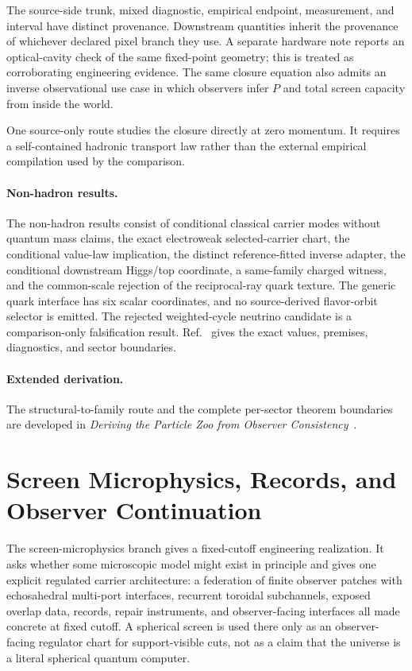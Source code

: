 The source-side trunk, mixed diagnostic, empirical endpoint, measurement, and
interval have distinct provenance. Downstream quantities inherit the provenance of whichever
declared pixel branch they use.
A separate hardware note reports an optical-cavity check of the same fixed-point geometry;
this is treated as corroborating engineering evidence.
The same closure equation also admits an inverse observational use case in which observers infer
\(P\) and total screen capacity from inside the world.

One source-only route studies the closure directly at zero momentum. It requires a self-contained
hadronic transport law rather than the external empirical compilation used by the comparison.

\paragraph{Non-hadron results.}
The non-hadron results consist of conditional classical carrier modes without
quantum mass claims, the exact electroweak selected-carrier chart, the
conditional value-law implication, the distinct reference-fitted inverse adapter, the conditional
downstream Higgs/top coordinate, a same-family charged witness, and the common-scale rejection of
the reciprocal-ray quark texture. The generic quark interface has six scalar coordinates, and no
source-derived flavor-orbit selector is emitted. The rejected weighted-cycle neutrino
candidate is a comparison-only falsification result. Ref.~\cite{ophparticles}
gives the exact values, premises, diagnostics, and sector boundaries.

\paragraph{Extended derivation.}
The structural-to-family route and the complete per-sector theorem boundaries
are developed in
\emph{Deriving the Particle Zoo from Observer Consistency}~\cite{ophparticles}.

\section{Screen Microphysics, Records, and Observer Continuation}

The screen-microphysics branch gives a fixed-cutoff engineering realization. It asks
whether some microscopic model might exist in principle and gives one explicit regulated
carrier architecture: a federation of finite observer patches with echosahedral multi-port
interfaces, recurrent toroidal subchannels, exposed overlap data, records, repair instruments,
and observer-facing interfaces all made concrete at fixed cutoff. A spherical screen is used
there only as an observer-facing regulator chart for support-visible cuts, not as a claim that
the universe is a literal spherical quantum computer.

